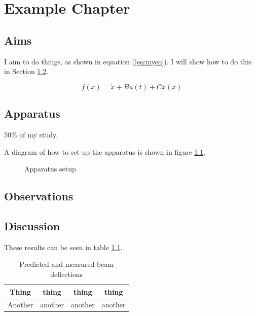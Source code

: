 \documentclass[a4paper]{report}
\begin{document}
\chapter{Example Chapter}

  \section{Aims}
  I aim to do things, as shown in equation (\ref{eq:myeq}). I will show how to do this in Section \ref{app}.

  \begin{equation}
  \label{eq:myeq}
  f(x) = \dot{x} + B u(t) + C x(x)
  \end{equation}


  \section{Apparatus}
  \label{app}

  	50\% of my study.

      A diagram of how to set up the apparatus is shown in figure \ref{fig:app}.

      \begin{figure}
      \centering
      \caption{Apparatus setup}
      \label{fig:app}
      \end{figure}

  \section{Observations}


  \section{Discussion}

      These results can be seen in table \ref{fig:myt}.

      \begin{table}
      \begin{center}
      \caption{Predicted and measured beam deflections}
      \begin{tabular}{|c|c|c|c|}
  	\hline
  	Thing & thing & thing & thing \\
  	\hline
  	Another & another & another & another \\
  	\hline
      \end{tabular}
      \end{center}
      \label{fig:myt}
      \end{table}
\end{document}
